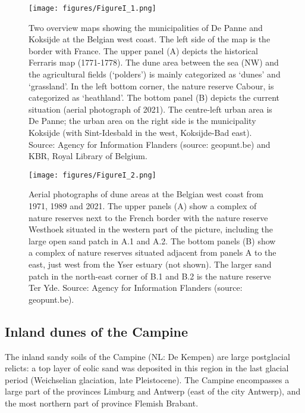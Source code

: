 \documentclass[10pt, twoside]{book} %
\begin{document}
	
	\renewcommand{\thefigure}{I.\arabic{figure}}
	\begin{figure}[h!]
		\begin{center}
			\texttt{[image: figures/FigureI\_1.png]}
		\end{center}
		\begin{footnotesize}
			\caption{Two overview maps showing the municipalities of De Panne and Koksijde at the Belgian west coast. The left side of the map is the border with France. The upper panel (A) depicts the historical Ferraris map (1771-1778). The dune area between the sea (NW) and the agricultural fields (`polders') is mainly categorized as `dunes' and `grassland'. In the left bottom corner, the nature reserve Cabour, is categorized as `heathland'. The bottom panel (B) depicts the current situation (aerial photograph of 2021). The centre-left urban area is De Panne; the urban area on the right side is the municipality Koksijde (with Sint-Idesbald in the west, Koksijde-Bad east). Source: Agency for Information Flanders (source: geopunt.be) and KBR, Royal Library of Belgium. \label{figI.1}}
		\end{footnotesize}
	\end{figure}


	\begin{sidewaysfigure}[h!]
		\begin{center}
			\texttt{[image: figures/FigureI\_2.png]}
		\end{center}
		\begin{footnotesize}
			\caption{Aerial photographs of dune areas at the Belgian west coast from 1971, 1989 and 2021. The upper panels (A) show a complex of nature reserves next to the French border with the nature reserve Westhoek situated in the western part of the picture, including the large open sand patch in A.1 and A.2. The bottom panels (B) show a complex of nature reserves situated adjacent from panels A to the east, just west from the Yser estuary (not shown). The larger sand patch in the north-east corner of B.1 and B.2 is the nature reserve Ter Yde. Source: Agency for Information Flanders (source: geopunt.be). \label{figI.2}}
		\end{footnotesize}
	\end{sidewaysfigure}
	
	\clearpage
	
	\subsection{Inland dunes of the Campine}
	The inland sandy soils of the Campine (NL: De Kempen) are large postglacial relicts: a top layer of eolic sand was deposited in this region in the last glacial period (Weichselian glaciation, late Pleistocene). The Campine encompasses a large part of the provinces Limburg and Antwerp (east of the city Antwerp), and the most northern part of province Flemish Brabant.\\
	
\end{document}
